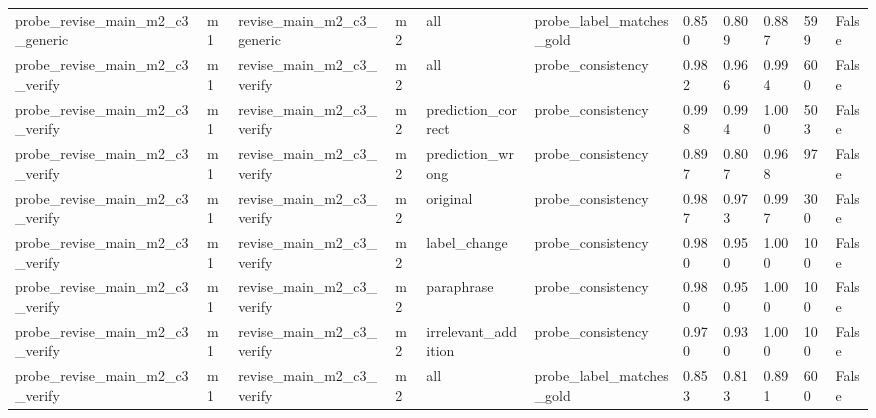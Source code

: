 \begin{tabular}{lllllllllll}
probe\_revise\_main\_m2\_c3\_generic & m1 & revise\_main\_m2\_c3\_generic & m2 & all & probe\_label\_matches\_gold & 0.850 & 0.809 & 0.887 & 599 & False \\
probe\_revise\_main\_m2\_c3\_verify & m1 & revise\_main\_m2\_c3\_verify & m2 & all & probe\_consistency & 0.982 & 0.966 & 0.994 & 600 & False \\
probe\_revise\_main\_m2\_c3\_verify & m1 & revise\_main\_m2\_c3\_verify & m2 & prediction\_correct & probe\_consistency & 0.998 & 0.994 & 1.000 & 503 & False \\
probe\_revise\_main\_m2\_c3\_verify & m1 & revise\_main\_m2\_c3\_verify & m2 & prediction\_wrong & probe\_consistency & 0.897 & 0.807 & 0.968 & 97 & False \\
probe\_revise\_main\_m2\_c3\_verify & m1 & revise\_main\_m2\_c3\_verify & m2 & original & probe\_consistency & 0.987 & 0.973 & 0.997 & 300 & False \\
probe\_revise\_main\_m2\_c3\_verify & m1 & revise\_main\_m2\_c3\_verify & m2 & label\_change & probe\_consistency & 0.980 & 0.950 & 1.000 & 100 & False \\
probe\_revise\_main\_m2\_c3\_verify & m1 & revise\_main\_m2\_c3\_verify & m2 & paraphrase & probe\_consistency & 0.980 & 0.950 & 1.000 & 100 & False \\
probe\_revise\_main\_m2\_c3\_verify & m1 & revise\_main\_m2\_c3\_verify & m2 & irrelevant\_addition & probe\_consistency & 0.970 & 0.930 & 1.000 & 100 & False \\
probe\_revise\_main\_m2\_c3\_verify & m1 & revise\_main\_m2\_c3\_verify & m2 & all & probe\_label\_matches\_gold & 0.853 & 0.813 & 0.891 & 600 & False \\
\bottomrule
\end{tabular}
